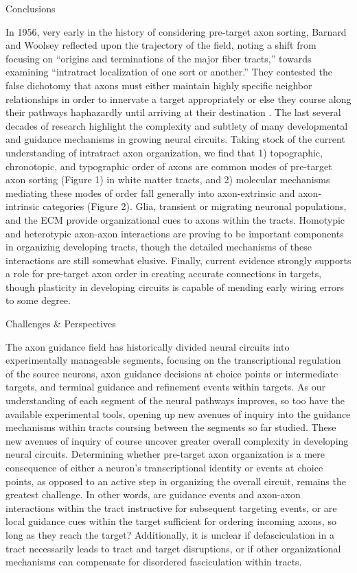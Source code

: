 Conclusions 

In 1956, very early in the history of considering pre-target axon sorting, Barnard and Woolsey reflected upon the trajectory of the field, noting a shift from focusing on “origins and terminations of the major fiber tracts,” towards examining “intratract localization of one sort or another.” 
They contested the false dichotomy that axons must either maintain highly specific neighbor relationships in order to innervate a target appropriately or else they course along their pathways haphazardly until arriving at their destination \cite{barnard1956study}. 
The last several decades of research highlight the complexity and subtlety of many developmental and guidance mechanisms in growing neural circuits. 
Taking stock of the current understanding of intratract axon organization, we find that 1) topographic, chronotopic, and typographic order of axons are common modes of pre-target axon sorting (Figure 1) in white matter tracts, and 2) molecular mechanisms mediating these modes of order fall generally into axon-extrinsic and axon-intrinsic categories (Figure 2). 
Glia, transient or migrating neuronal populations, and the ECM provide organizational cues to axons within the tracts.
Homotypic and heterotypic axon-axon interactions are proving to be important components in organizing developing tracts, though the detailed mechanisms of these interactions are still somewhat elusive. 
Finally, current evidence strongly supports a role for pre-target axon order in creating accurate connections in targets, though plasticity in developing circuits is capable of mending early wiring errors to some degree.


Challenges & Perspectives

The axon guidance field has historically divided neural circuits into experimentally manageable segments, focusing on the transcriptional regulation of the source neurons, axon guidance decisions at choice points or intermediate targets, and terminal guidance and refinement events within targets. 
As our understanding of each segment of the neural pathways improves, so too have the available experimental tools, opening up new avenues of inquiry into the guidance mechanisms within tracts coursing between the segments so far studied. 
These new avenues of inquiry of course uncover greater overall complexity in developing neural circuits. 
Determining whether pre-target axon organization is a mere consequence of either a neuron’s transcriptional identity or events at choice points, as opposed to an active step in organizing the overall circuit, remains the greatest challenge. 
In other words, are guidance events and axon-axon interactions within the tract instructive for subsequent targeting events, or are local guidance cues within the target sufficient for ordering incoming axons, so long as they reach the target? 
Additionally, it is unclear if defasciculation in a tract necessarily leads to tract and target disruptions, or if other organizational mechanisms can compensate for disordered fasciculation within tracts.

